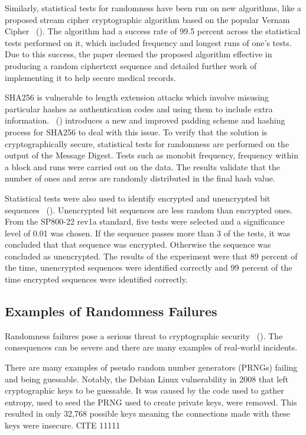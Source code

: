 Similarly, statistical tests for randomness have been run on new algorithms, like a proposed stream cipher cryptographic algorithm based on the popular Vernam Cipher ~(\cite{9232553}). The algorithm had a success rate of 99.5 percent across the statistical tests performed on it, which included frequency and longest runs of one's tests. Due to this success, the paper deemed the proposed algorithm effective in producing a random ciphertext sequence and detailed further work of implementing it to help secure medical records. \newline

SHA256 is vulnerable to length extension attacks which involve misusing particular hashes as authentication codes and using them to include extra information. ~(\cite{33333}) introduces a new and improved padding scheme and hashing process for SHA256 to deal with this issue. To verify that the solution is cryptographically secure, statistical tests for randomness are performed on the output of the Message Digest. Tests such as monobit frequency, frequency within a block and runs were carried out on the data. The results validate that the number of ones and zeros are randomly distributed in the final hash value. \newline

Statistical tests were also used to identify encrypted and unencrypted bit sequences ~(\cite{7406118}). Unencrypted bit sequences are less random than encrypted ones. From the SP800-22 rev1a standard, five tests were selected and a significance level of 0.01 was chosen.  If the sequence passes more than 3 of the tests, it was concluded that that sequence was encrypted. Otherwise the sequence was concluded as unencrypted. The results of the experiment were that 89 percent of the time, unencrypted sequences were identified correctly and 99 percent of the time encrypted sequences were identified correctly. \newline

\subsection{Examples of Randomness Failures}

Randomness failures pose a serious threat to cryptographic security ~(\cite{10.1145/3052973.3053040}). The consequences can be severe and there are many examples of real-world incidents. \newline

There are many examples of pseudo random number generators (PRNGs) failing and being guessable. Notably, the Debian Linux vulnerability in 2008 that left cryptographic keys to be guessable. It was caused by the code used to gather entropy, used to seed the PRNG used to create private keys, were removed. This resulted in only 32,768 possible keys meaning the connections made with these keys were insecure. CITE 11111 \newline

